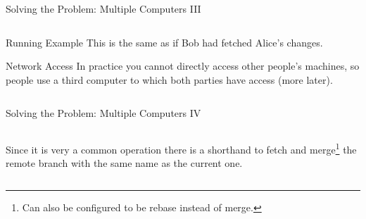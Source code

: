 \documentclass[xetex]{beamer}
\begin{document}
\begin{frame}[fragile]{Solving the Problem: Multiple Computers III}
\begin{columns}
\begin{column}{.4\linewidth}
      \begin{exampleblock}{Running Example}
        This is the same as if Bob had fetched Alice's changes.
      \end{exampleblock}

      \begin{alertblock}{Network Access}
        \footnotesize
        In practice you cannot directly access other people's machines, so
        people use a third computer to which both parties have access (more
        later).
      \end{alertblock}
    \end{column}
  \end{columns}
\end{frame}

\begin{frame}[fragile]{Solving the Problem: Multiple Computers IV}
  \begin{columns}
    \begin{column}{1.1\linewidth}
      Since it is very a common operation there is a shorthand to fetch and
      merge\footnote{Can also be configured to be rebase instead of merge.} the remote branch
      with the same name as the current one.

      \begin{center}
        \noindent
\end{center}
\end{column}
\end{columns}
\end{frame}
\end{document}

